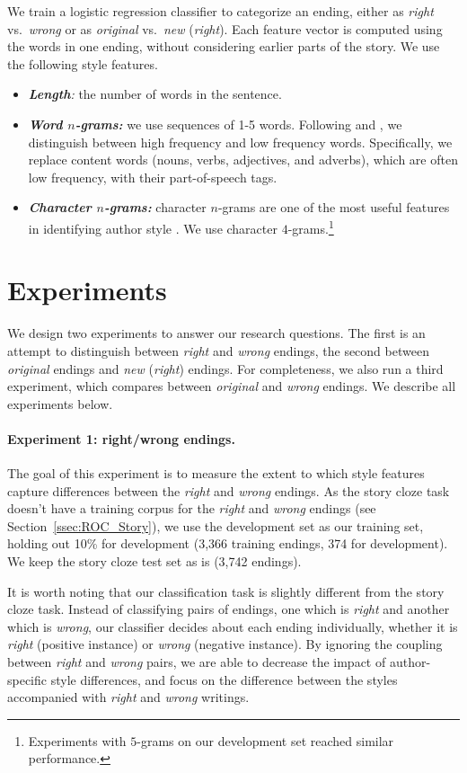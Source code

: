 \documentclass[11pt,a4paper]{article}
\newcommand{\secref}[1]{Section~\ref{ssec:#1}}
\newcommand{\isectionb}[1]{\section{#1}\label{ssec:#1}}
\newcommand{\resolved}[1]{}
\newcommand{\roy}[1]{{\color{orange}\textsc{[#1 --rs]}}}
\newcommand{\nascomment}[1]{{\color{blue}\textsc{[#1 --nas]}}}
\renewcommand{\roy}[1]{{\color{orange}[#1 --rs]}}
\renewcommand{\roy}[1]{#1}
\renewcommand{\nascomment}[1]{}
\begin{document}
We train a logistic regression classifier to categorize an ending,
either as {\it right} vs.~{\it wrong} or as {\it original} vs.~{\it new} ({\it right}).
Each feature vector is computed using the words in one ending, without considering earlier parts of the story. 
We use the following style features.

\begin{itemize}
\item\textit{\textbf{Length}:} the number of words in the sentence.
\item\textit{\textbf{Word $n$-grams:}} we use sequences of 1-5
  words. Following \citet{Tsur:2010} and \citet{Schwartz:2013}, we distinguish between high frequency and low frequency words. 
Specifically, we replace content words (nouns, verbs, adjectives, and adverbs), which are often low frequency, with their part-of-speech tags.
\item\textit{\textbf{Character $n$-grams:}} character $n$-grams are one of the most useful features in identifying author style \cite{Stamatatos:2009}. 
We use character $4$-grams.\footnote{\roy{Experiments with $5$-grams on our development set reached similar performance.}}
\end{itemize}

\isectionb{Experiments}
We design two experiments to answer our research questions. 
The first is an attempt to distinguish between {\it right} and {\it wrong} endings,
the second  between {\it original} endings and {\it new} ({\it right}) endings.
For completeness, we also run a third experiment, which compares between {\it original} and {\it wrong} endings. 
We describe all experiments below.

\paragraph{Experiment 1: right/wrong endings.}
The goal of this experiment is to measure the extent to which  style features capture differences between the {\it right} and {\it wrong} endings.
As the story cloze task doesn't have a training corpus for the {\it
  right} and {\it wrong} endings (see \secref{ROC_Story}), we use the
development set as our training set, holding out 10\% for development
(3,366 training endings, 374 for development). 
 We keep the story cloze test set as is (3,742 endings).

It is worth noting that our classification task is slightly different from the story cloze task. 
Instead of classifying pairs of endings, one which is {\it right} and
another which is {\it wrong}, our classifier decides about each ending
individually, whether it is \emph{right} (positive instance) or
\emph{wrong} (negative instance).
By ignoring the coupling between {\it right} and {\it wrong} pairs, 
we are able to decrease the impact of author-specific style differences,
and focus on the difference between the styles accompanied with {\it right} and {\it wrong} writings.
\resolved{we
are able make a more general claim about the style used when writing
each of the tasks \nascomment{I'm not sure I follow this sentence; can
we be more clear?}.}
\end{document}
